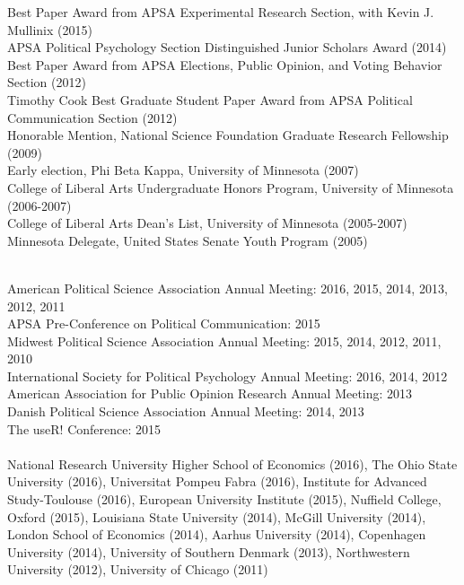 \documentclass[12pt]{article}
\renewcommand{\section}[1]{\pagebreak[3]%
    \llap{\scshape\smash{\parbox[t]{\marginparwidth}{\raggedright {\color{lg}#1}}}}%
    \vspace{-\baselineskip}\par}
\newcommand{\topic}[1]{\pagebreak[3]\indent {\color{lg}{\footnotesize #1 }}\\}
\newcommand{\entry}[1]{\indent {\color{lg}\guillemotright}\hspace{2pt}#1\vspace{.25em}\\}
\begin{document}
\section{Honors\\and\\Awards}
\entry{Best Paper Award from APSA Experimental Research Section, with Kevin J. Mullinix (2015)}
\entry{APSA Political Psychology Section Distinguished Junior Scholars Award (2014)}
\entry{Best Paper Award from APSA Elections, Public Opinion, and Voting Behavior Section (2012)}
\entry{Timothy Cook Best Graduate Student Paper Award from APSA Political Communication Section (2012)}
\entry{Honorable Mention, National Science Foundation Graduate Research Fellowship (2009)}
\entry{Early election, Phi Beta Kappa, University of Minnesota (2007)}
\entry{College of Liberal Arts Undergraduate Honors Program, University of Minnesota (2006-2007)}
\entry{College of Liberal Arts Dean's List, University of Minnesota (2005-2007)}
\entry{Minnesota Delegate, United States Senate Youth Program (2005)}

\section{Conference\\Papers\\and\\Invited\\Presentations}
\topic{Conference Papers}
\entry{American Political Science Association Annual Meeting: 2016, 2015, 2014, 2013, 2012, 2011}
\entry{APSA Pre-Conference on Political Communication: 2015}
\entry{Midwest Political Science Association Annual Meeting: 2015, 2014, 2012, 2011, 2010}
\entry{International Society for Political Psychology Annual Meeting: 2016, 2014, 2012}
\entry{American Association for Public Opinion Research Annual Meeting: 2013}
\entry{Danish Political Science Association Annual Meeting: 2014, 2013}
\entry{The useR! Conference: 2015}

\topic{Invited Presentations}
\entry{National Research University Higher School of Economics (2016), The Ohio State University (2016), Universitat Pompeu Fabra (2016), Institute for Advanced Study-Toulouse (2016), European University Institute (2015), Nuffield College, Oxford (2015), Louisiana State University (2014), McGill University (2014), London School of Economics (2014), Aarhus University (2014), Copenhagen University (2014), University of Southern Denmark (2013), Northwestern University (2012), University of Chicago (2011)}
\end{document}
